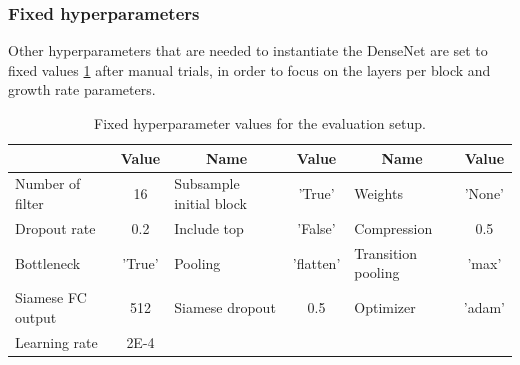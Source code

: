 \subsubsection{Fixed hyperparameters}
Other hyperparameters that are needed to instantiate the DenseNet are set to fixed values \ref{table:architecture_densenet_siamese} after manual trials, in order to focus on the layers per block and growth rate parameters.

\begin{table}[ht]
\centering
\caption{Fixed hyperparameter values for the evaluation setup.}
\resizebox{\textwidth}{!}
{\begin{tabular}{|l c| l c| l c|} 
 \hline\hline
 \rowcolor{lightgrey}
 \multicolumn{1}{|c}{\textbf{Name}} & \multicolumn{1}{c|}{\textbf{Value}} & \multicolumn{1}{c}{\textbf{Name}} & \multicolumn{1}{c|}{\textbf{Value}} & \multicolumn{1}{c}{\textbf{Name}} & \multicolumn{1}{c|}{\textbf{Value}} \\ [0.5ex] 
 \hline
 Number of filter & 16 & Subsample initial block & 'True' & Weights & 'None'\\
 \hline
 Dropout rate & 0.2 & Include top & 'False' & Compression & 0.5\\
 \hline
 Bottleneck & 'True' &  Pooling & 'flatten' & Transition pooling & 'max' \\
 \hline
 Siamese FC output & 512 & Siamese dropout & 0.5 & Optimizer & 'adam' \\
 \hline
 Learning rate & 2E-4 & & & & \\
 \hline \hline
\end{tabular}}
\label{table:architecture_densenet_siamese}
\end{table}

